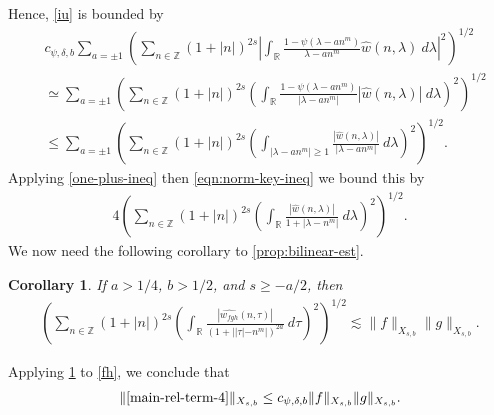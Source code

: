 \documentclass[12pt,reqno]{amsart}
\numberwithin{equation}{section}  %
\newcommand{\rr}{\mathbb{R}}
\newcommand{\zz}{\mathbb{Z}}
\newcommand{\wh}{\widehat}
\newtheorem{corollary}[theorem]{Corollary}
\begin{document}
%
Hence, \eqref{iu} is bounded by
%
\begin{equation}
  \begin{split}
    & c_{\psi, \delta, b} \sum_{a = \pm 1}\left( \sum_{n \in \zz} \left (1 + |n| \right )^{2s} | \int_\rr
		\frac{1 - \psi\left( \lambda - an^{m } \right)}{\lambda - an^{m }}
		\wh{w}(n, \lambda) \ d\lambda |^2 \right)^{1/2}
		\\
		& \simeq \sum_{a = \pm 1} \left( \sum_{n \in \zz} \left (1 + |n| \right )^{2s}  \left ( \int_\rr
		\frac{1 - \psi\left( \lambda - an^{m } \right)}{|\lambda - an^{m }|}
		|\wh{w}(n, \lambda) | \ d\lambda \right )^2 \right)^{1/2}
		\\
		& \le \sum_{a = \pm 1} \left( \sum_{n \in \zz} \left (1 + |n| \right )^{2s}  \left ( \int_{| \lambda - 
		an^{m } | \ge 1}
		\frac{|\wh{w}(n, \lambda) | }{|\lambda - an^{m }|}
		\ d\lambda \right )^2 \right)^{1/2}.
  \end{split}
\end{equation}
Applying \eqref{one-plus-ineq} then \eqref{eqn:norm-key-ineq} we bound this by
\begin{equation}
  \label{fh}
\begin{split}
    4 \left( \sum_{n \in \zz} \left (1 + |n| \right )^{2s}  \left ( \int_\rr
    \frac{|\wh{w}(n, \lambda)| }{1 + |\lambda - n^{m }|}
    \ d\lambda \right )^2 \right)^{1/2}.
	\end{split}
\end{equation}
%
%
%
We now need the following corollary to
\cref{prop:bilinear-est}.
%
%
%
%
%
%
%
%
\begin{corollary}
\label{cor:bilinear-estimate2}
	If $a > 1/4$, $b > 1/2$, and $s \ge -a/2$, 
  then 
%
%
\begin{equation}
	\label{bilinear-estimate2}
	\begin{split}
		\left( \sum_{n \in \zz} \left (1 + |n| \right )^{2s}  \left ( \int_\rr 
    \frac{|\wh{w_{fgh}}(n, \tau) |}{(1 + | |\tau| - n^{m } |)^{2a}}
		 \ d\tau \right)^2  \right)^{1/2} \lesssim \|f\|_{X_{s,b}} \|g\|_{X_{s,b}}.
	\end{split}
\end{equation}
\end{corollary}
Applying \cref{cor:bilinear-estimate2} to \eqref{fh}, we
conclude that
%
%
\begin{equation}
	\label{main-int3-est}
	\begin{split}
		\|\eqref{main-rel-term-4}\|_{X_{s,b}} 
    \le c_{\psi, \delta, b} \|f\|_{X_{s,b}} \|g\|_{X_{s,b}}. 
	\end{split}
\end{equation}
%
%
%
\end{document}
